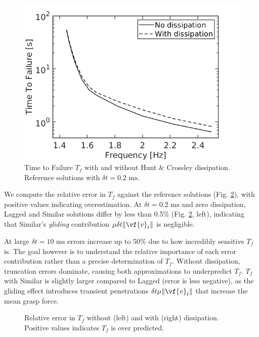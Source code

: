 \begin{figure}[!h]
    \centering
    \includegraphics[width=0.8\columnwidth]{figures/TestCases/FrankaHand/time_to_failure_reference.png}
    \caption{Time to Failure $T_f$ with and without Hunt \& Crossley dissipation. Reference solutions
    with $\delta t = 0.2\text{ ms}$.}
    \label{fig:ranka_reference_solutions}
\end{figure}

We compute the relative error in $T_f$ against the reference solutions (Fig.
\ref{fig:franka_time_to_failure_errors}), with positive values indicating
overestimation. At $\delta t=0.2\text{ ms}$ and zero dissipation, Lagged and
Similar solutions differ by less than 0.5\% (Fig.
\ref{fig:franka_time_to_failure_errors}, left), indicating that Similar's
\emph{gliding} contribution $\mu\delta t\Vert\vf{v}_t\Vert$ is negligible.

At large $\delta t=10\text{ ms}$ errors increase up to 50\% due to how
incredibly sensitive $T_f$ is. The goal however is to understand the relative
importance of each error contribution rather than a precise determination of
$T_f$. Without dissipation, truncation errors dominate, causing both
approximations to underpredict $T_f$. $T_f$ with Similar is slightly larger
compared to Lagged (error is less negative), as the gliding effect introduces
transient penetrations $\delta t\mu\Vert\vf{v}_t\Vert$ that increase the mean
grasp force.

\begin{figure}[!h]
    \centering
    \caption{\label{fig:franka_time_to_failure_errors} Relative error in $T_f$ without
    (left) and with (right) dissipation. Positive values indicates $T_f$ is over predicted.}
\end{figure}

